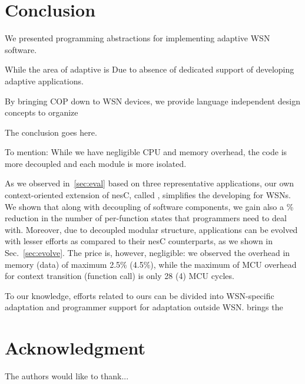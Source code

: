 \section{Conclusion}\label{sec:ending}

We presented programming abstractions for implementing adaptive WSN software. 

While the area of adaptive is Due to absence of dedicated support of developing adaptive applications.

By bringing COP down to WSN devices, we provide language independent design concepts to organize

The conclusion goes here.

To mention: While we have negligible CPU and memory overhead, the code is more decoupled and each module is more isolated.

As we observed in~\ref{sec:eval} based on three representative applications, our own context-oriented extension of nesC, called \conesc, simplifies the developing for WSNs. We shown that along with decoupling of software components, we gain also a \% reduction in the number of per-function states that programmers need to deal with. Moreover, due to decoupled modular structure, \conesc applications can be evolved with lesser efforts as compared to their nesC counterparts, as we shown in Sec.~\ref{sec:evolve}. The price is, however, negligible: we observed the overhead in memory (data) of maximum 2.5\% (4.5\%), while the maximum of MCU overhead for context transition (function call) is only 28 (4) MCU cycles.

To our knowledge, efforts related to ours can be divided into WSN-specific adaptation and programmer support for adaptation outside WSN. \conec brings the 




\section*{Acknowledgment}


The authors would like to thank...







%
%
%
